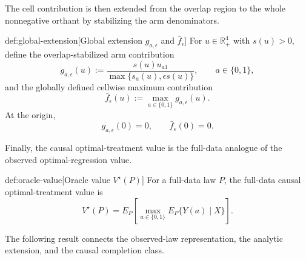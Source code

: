 \documentclass[11pt]{article}
\begin{document}
The cell contribution is then extended from the overlap region to the whole nonnegative orthant by stabilizing the arm denominators.

\begin{definitionv}{def:global-extension}[Global extension \(g_{a,\epsilon}\) and \(\bar f_\epsilon\)]
For \(u\in\mathbb R_+^4\) with \(s(u)>0\), define the overlap-stabilized arm contribution
\[
g_{a,\epsilon}(u)
:=
\frac{s(u)u_{a1}}{\max\{s_a(u),\epsilon s(u)\}},
\qquad a\in\{0,1\},
\]
and the globally defined cellwise maximum contribution
\[
\bar f_\epsilon(u)
:=
\max_{a\in\{0,1\}} g_{a,\epsilon}(u).
\]
At the origin,
\[
g_{a,\epsilon}(0)=0,
\qquad
\bar f_\epsilon(0)=0.
\]
\end{definitionv}

Finally, the causal optimal-treatment value is the full-data analogue of the observed optimal-regression value.

\begin{definitionv}{def:oracle-value}[Oracle value \(V^\star(P)\)]
For a full-data law \(P\), the full-data causal optimal-treatment value is
\[
V^\star(P)
=
E_P\!\left[
\max_{a\in\{0,1\}}
E_P\{Y(a)\mid X\}
\right].
\]
\end{definitionv}

The following result connects the observed-law representation, the analytic extension, and the causal completion class.
\end{document}
